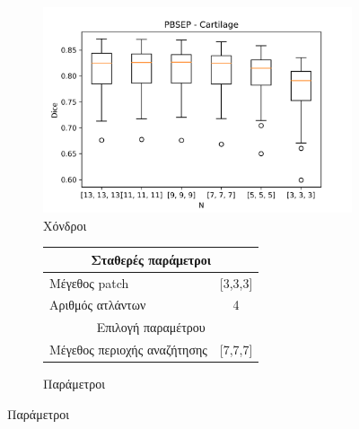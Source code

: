 \documentclass{beamer}
\begin{document}
\begin{frame}
\begin{figure}[H]
    \begin{subfigure}[b]{0.42\linewidth}
    \includegraphics[width=\linewidth]{PBSEP_N_Cartilage_plot.png}
    \caption{Χόνδροι}
    \end{subfigure}
    \begin{subfigure}[b]{0.42\linewidth}
        \begin{tabular}[t]{|l|c|} 
            \multicolumn{2}{c}{\footnotesize Σταθερές παράμετροι} \\
            \hline
            \footnotesize Μέγεθος patch & \footnotesize [3,3,3] \\
            \hline
            \footnotesize Αριθμός ατλάντων & \footnotesize 4 \\ 
            \hline
            \multicolumn{2}{c}{\footnotesize Επιλογή παραμέτρου} \\
            \hline
            \footnotesize Μέγεθος περιοχής αναζήτησης & \footnotesize  [7,7,7] \\ 
            \hline
        \end{tabular}
    \caption{Παράμετροι}
    \end{subfigure}
\end{figure}

\end{frame}
\end{document}
